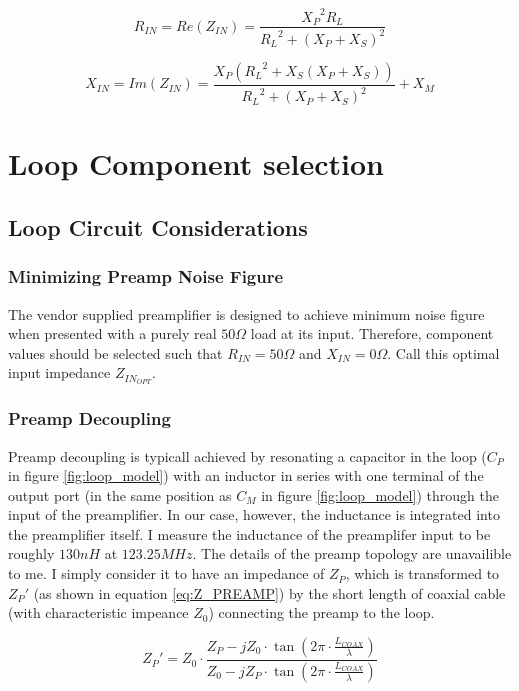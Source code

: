 \begin{equation} \label{eq:R_IN}
    R_{IN}=Re(Z_{IN})=\frac{{X_P}^2 R_L}{{R_L}^2+(X_P+X_S)^2}
\end{equation}

\begin{equation} \label{eq:X_IN}
    X_{IN}= Im(Z_{IN}) = \frac{X_P ({R_L}^2 + X_S(X_P+X_S))}{{R_L}^2+(X_P+X_S)^2}+X_M
\end{equation}

\section{Loop Component selection}

\subsection{Loop Circuit Considerations}
\subsubsection{Minimizing Preamp Noise Figure}
The vendor supplied preamplifier is designed to achieve minimum noise figure when presented with a purely real
$50\Omega$ load at its input. Therefore, component values should be selected such that $R_{IN}=50\Omega$ and
$X_{IN}=0\Omega$. Call this optimal input impedance $Z_{IN_{OPT}}$.

\subsubsection{Preamp Decoupling}
Preamp decoupling is typicall achieved by resonating a capacitor in the loop ($C_P$ in figure \ref{fig:loop_model}) with
an inductor in series with one terminal of the output port (in the same position as $C_M$ in figure
\ref{fig:loop_model}) through the input of the preamplifier. In our case, however, the inductance is integrated into the
preamplifier itself. I measure the inductance of the preamplifer input to be roughly $130nH$ at $123.25 MHz$. The
details of the preamp topology are unavailible to me. I simply consider it to have an impedance of $Z_P$, which
is transformed to ${Z_P}'$ (as shown in equation \ref{eq:Z_PREAMP}) by the short length of coaxial cable (with
characteristic impeance $Z_0$) connecting the preamp to the loop.

\begin{equation} \label{eq:Z_PREAMP}
    {Z_P}'=Z_0 \cdot \frac{Z_P-j Z_0 \cdot \tan(2\pi\cdot\frac{L_{COAX}}{\lambda})}{Z_0 - j Z_P \cdot
    \tan(2\pi\cdot\frac{L_{COAX}}{\lambda})}
\end{equation}

